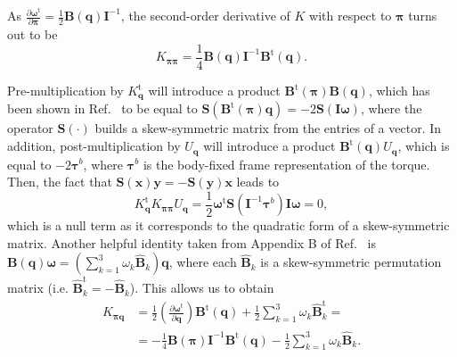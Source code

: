 \documentclass[
journal=jctcce,
layout=twocolumn
]{achemso}
\newcommand{\mt}[1]{\boldsymbol{\mathbf{#1}}}   %
\newcommand{\vt}[1]{\boldsymbol{\mathbf{#1}}}   %
\newcommand{\tr}[1]{#1^\text{t}}                %
\newcommand{\diff}[2]{\frac{\partial #1}{\partial #2}} %
\begin{document}
As $\diff{\tr{\vt \omega}}{\vt \pi} = \frac{1}{2} {\mt B}(\vt q) {\mt I}^{-1}$, the second-order derivative of $K$ with respect to $\vt \pi$ turns out to be
\begin{equation*}
K_{\vt \pi \vt \pi} = \frac{1}{4} {\mt B}(\vt q) {\mt I}^{-1} \tr{\mt B}(\vt q).
\end{equation*}

Pre-multiplication by $\tr{K_{\vt q}}$ will introduce a product $\tr{\mt B}(\vt \pi) {\mt B}(\vt q)$, which has been shown in Ref.~ to be equal to ${\mt S}\left( \tr{\mt B}(\vt \pi) {\vt q} \right) = -2 {\mt S}({\mt I} {\vt \omega})$, where the operator ${\mt S}(\cdot)$ builds a skew-symmetric matrix from the entries of a vector.
In addition, post-multiplication by $U_{\vt q}$ will introduce a product $\tr{\mt B}(\vt q) U_{\vt q}$, which is equal to $-2 {\vt \tau}^b$, where ${\vt \tau}^b$ is the body-fixed frame representation of the torque.
Then, the fact that ${\mt S}(\vt x) {\vt y} = -{\mt S}(\vt y) {\vt x}$ leads to
\begin{equation*}
\tr{K_{\vt q}} K_{\vt \pi \vt \pi} U_{\vt q} = \frac{1}{2} \tr{\vt \omega} {\mt S}({\mt I}^{-1} {\vt \tau}^b) {\mt I} {\vt \omega} = 0,
\end{equation*}
which is a null term as it corresponds to the quadratic form of a skew-symmetric matrix.
Another helpful identity taken from Appendix B of Ref.~ is ${\mt B}(\vt q){\vt \omega} = ( \sum_{k=1}^3 \omega_k \hat{\mt B}_k ) \vt q$, where each $\hat{\mt B}_k$ is a skew-symmetric permutation matrix (i.e.
$\tr{\hat{\mt B}}_k = -\hat{\mt B}_k$).
This allows us to obtain
\begin{align*}
K_{\vt \pi \vt q} &= \frac{1}{2} (\diff{\tr{\vt \omega}}{\vt q}) \tr{\mt B}(\vt q) + \frac{1}{2} \sum_{k=1}^3 \omega_k \tr{\hat{\mt B}}_k = \\
&= -\frac{1}{4} {\mt B}(\vt \pi) {\mt I}^{-1} \tr{\mt B}(\vt q) - \frac{1}{2} \sum_{k=1}^3 \omega_k \hat{\mt B}_k.
\end{align*}
\end{document}
